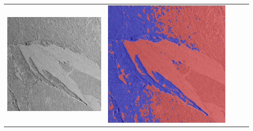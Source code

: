 \begin{table}[h!]
\begin{tabularx}{\textwidth}{>{\centering}m{}
			>{\centering}m{}
			>{\centering}m{}
			>{\centering}m{}
			>{\centering\arraybackslash}m{}}
		\includegraphics[width=0.9\linewidth]{images/p03/p03_03.png} &
		\includegraphics[width=0.9\linewidth]{images/gen/fully_connected/p03_03.png_0.png} &

\end{tabularx}
\end{table}
